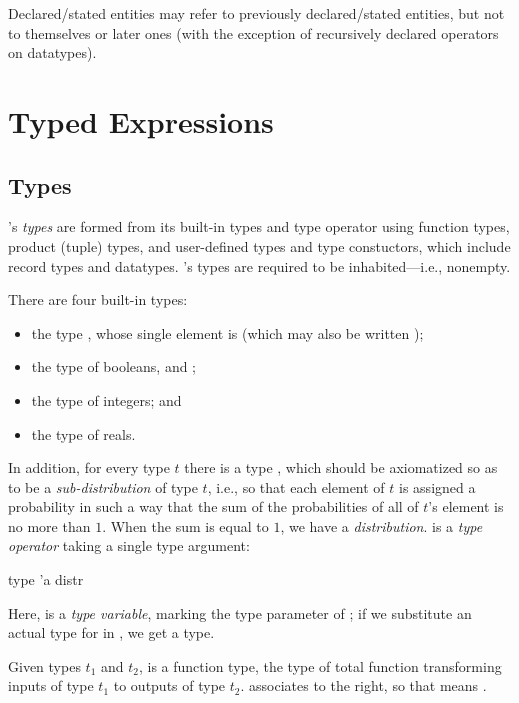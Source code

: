 Declared/stated entities may refer to previously declared/stated entities,
but not to themselves or later ones (with the exception of recursively
declared operators on datatypes).

\section{Typed Expressions}

\subsection{Types}

\EasyCrypt's \emph{types} are formed from its built-in types and
type operator using function types, product (tuple) types, and
user-defined types and type constuctors, which include record types
and datatypes. \EasyCrypt's types are required to be inhabited---i.e.,
nonempty.

There are four built-in types:
\begin{itemize}
\item the type , whose single element is  (which may
  also be written \ec{()});

\item the type  of booleans,  and ;

\item the type  of integers; and

\item the type  of reals.
\end{itemize}

In addition, for every type $t$ there is a type , which
should be axiomatized so as to be a \emph{sub-distribution} of type
$t$, i.e., so that each element of $t$ is assigned a probability in
such a way that the sum of the probabilities of all of $t$'s element
is no more than $1$. When the sum is equal to $1$, we have a
\emph{distribution}.  is a \emph{type operator} taking a
single type argument:
\begin{easycrypt}{}{}
type 'a distr
\end{easycrypt}
Here,  is a \emph{type variable}, marking the type parameter of
; if we substitute an actual type for  in ,
we get a type.

Given types $t_1$ and $t_2$,  is a function type,
the type of total function transforming inputs of type $t_1$ to
outputs of type $t_2$. \ec{->} associates to the right, so that
 means .


